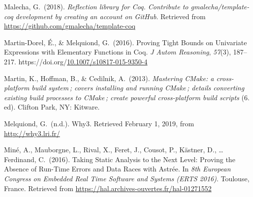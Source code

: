 \documentclass[12pt,twoside]{article}
\begin{document}
{\begin{thebibliography}{222}
\mdbibitemlabel{}Malecha, G.~(2018). \emph{Reflection library for Coq. Contribute to gmalecha/template-coq development by creating an account on GitHub}. Retrieved from \href{https://github.com/gmalecha/template-coq}{{\ttfamily https://\hspace{0pt}github.\hspace{0pt}com/\hspace{0pt}gmalecha/\hspace{0pt}template-\hspace{0pt}coq}}\label{malecha_reflection_2018}%

\mdbibitemlabel{}Martin-Dorel, É., \& Melquiond, G.~(2016). Proving Tight Bounds on Univariate Expressions with Elementary Functions in Coq. \emph{J Autom Reasoning}, \emph{57}(3), 187–217. https://doi.org/\href{https://dx.doi.org/10.1007/s10817-015-9350-4}{10.1007/s10817-015-9350-4}\label{martin-dorel_proving_2016}%

\mdbibitemlabel{}Martin, K., Hoffman, B., \& Cedilnik, A.~(2013). \emph{Mastering CMake: a cross-platform build system ; covers installing and running CMake ; details converting existing build processes to CMake ; create powerful cross-platform build scripts} (6. ed). Clifton Park, NY: Kitware.\label{martin_mastering_2013}%

\mdbibitemlabel{}Melquiond, G.~(n.d.). Why3. Retrieved February 1, 2019, from \href{http://why3.lri.fr/}{{\ttfamily http://\hspace{0pt}why3.\hspace{0pt}lri.\hspace{0pt}fr/\hspace{0pt}}}\label{melquiond_why3_nodate}%

\mdbibitemlabel{}Miné, A., Mauborgne, L., Rival, X., Feret, J., Cousot, P., Kästner, D., … Ferdinand, C.~(2016). Taking Static Analysis to the Next Level: Proving the Absence of Run-Time Errors and Data Races with Astrée. In \emph{8th European Congress on Embedded Real Time Software and Systems (ERTS 2016)}. Toulouse, France. Retrieved from \href{https://hal.archives-ouvertes.fr/hal-01271552}{{\ttfamily https://\hspace{0pt}hal.\hspace{0pt}archives-\hspace{0pt}ouvertes.\hspace{0pt}fr/\hspace{0pt}hal-\hspace{0pt}01271552}}\label{mine_taking_2016}%


\end{thebibliography}}
\end{document}
